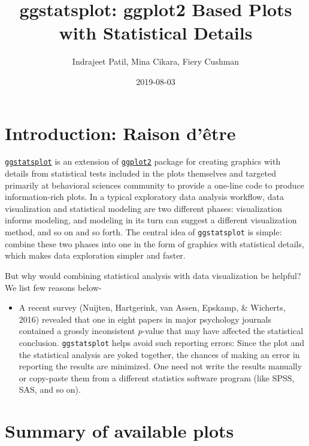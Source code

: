 \documentclass[]{article}
\title{ggstatsplot: ggplot2 Based Plots with Statistical Details}
\author{Indrajeet Patil, Mina Cikara, Fiery Cushman}
\date{2019-08-03}
\providecommand{\tightlist}{%
  \setlength{\itemsep}{0pt}\setlength{\parskip}{0pt}}
\begin{document}
\maketitle

{
\setcounter{tocdepth}{2}
\tableofcontents
}
\hypertarget{introduction-raison-detre}{%
\section{Introduction: Raison d'être}\label{introduction-raison-detre}}

\href{https://indrajeetpatil.github.io/ggstatsplot/}{\texttt{ggstatsplot}}
is an extension of
\href{https://github.com/tidyverse/ggplot2}{\texttt{ggplot2}} package
for creating graphics with details from statistical tests included in
the plots themselves and targeted primarily at behavioral sciences
community to provide a one-line code to produce information-rich plots.
In a typical exploratory data analysis workflow, data visualization and
statistical modeling are two different phases: visualization informs
modeling, and modeling in its turn can suggest a different visualization
method, and so on and so forth. The central idea of \texttt{ggstatsplot}
is simple: combine these two phases into one in the form of graphics
with statistical details, which makes data exploration simpler and
faster.

But why would combining statistical analysis with data visualization be
helpful? We list few reasons below-

\begin{itemize}
\tightlist
\item
  A recent survey (Nuijten, Hartgerink, van Assen, Epskamp, \& Wicherts,
  2016) revealed that one in eight papers in major psychology journals
  contained a grossly inconsistent \emph{p}-value that may have affected
  the statistical conclusion. \texttt{ggstatsplot} helps avoid such
  reporting errors: Since the plot and the statistical analysis are
  yoked together, the chances of making an error in reporting the
  results are minimized. One need not write the results manually or
  copy-paste them from a different statistics software program (like
  SPSS, SAS, and so on).
\end{itemize}

\hypertarget{summary-of-available-plots}{%
\section{Summary of available plots}\label{summary-of-available-plots}}
\end{document}
